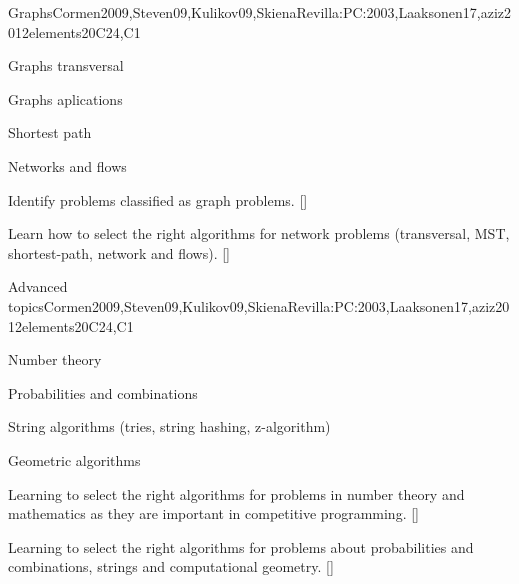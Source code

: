 \begin{syllabus}
  \begin{unit}{Graphs}{}{Cormen2009,Steven09,Kulikov09,SkienaRevilla:PC:2003,Laaksonen17,aziz2012elements}{20}{C24,C1}
    \begin{topics}
      \item Graphs transversal 
      \item Graphs aplications 
      \item Shortest path
      \item Networks and flows
    \end{topics}
    \begin{learningoutcomes}
        \item Identify problems classified as graph problems. [\Usage]
        \item Learn how to select the right algorithms for network problems (transversal, MST, shortest-path, network and flows). [\Usage]
    \end{learningoutcomes}
  \end{unit}
  
  \begin{unit}{Advanced topics}{}{Cormen2009,Steven09,Kulikov09,SkienaRevilla:PC:2003,Laaksonen17,aziz2012elements}{20}{C24,C1}
    \begin{topics}
      \item Number theory 
      \item Probabilities and combinations 
      \item String algorithms (tries, string hashing, z-algorithm)
      \item Geometric algorithms
    \end{topics}
    \begin{learningoutcomes}
        \item Learning to select the right algorithms for problems in number theory and mathematics as they are important in competitive programming. [\Usage]
        \item Learning to select the right algorithms for problems about probabilities and combinations, strings and computational geometry. [\Usage]
    \end{learningoutcomes}
  \end{unit}
  

\end{syllabus}
